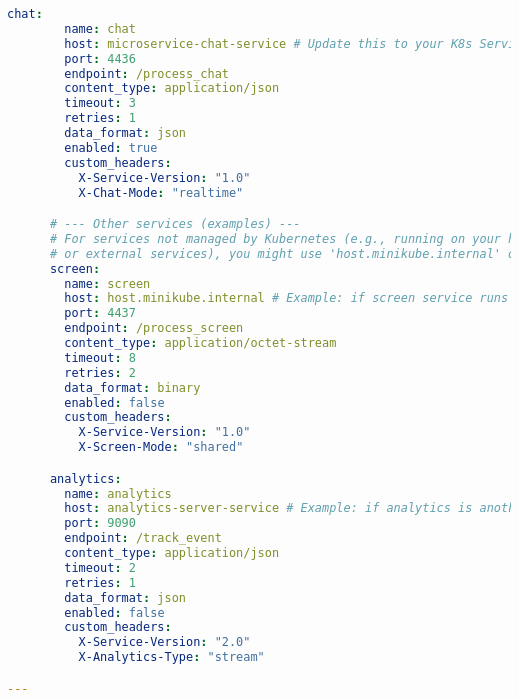\begin{lstlisting}[breaklines=true, caption={Router Kubernetes Deployment}, language=yaml]
      chat:
        name: chat
        host: microservice-chat-service # Update this to your K8s Service Name
        port: 4436
        endpoint: /process_chat
        content_type: application/json
        timeout: 3
        retries: 1
        data_format: json
        enabled: true
        custom_headers:
          X-Service-Version: "1.0"
          X-Chat-Mode: "realtime"

      # --- Other services (examples) ---
      # For services not managed by Kubernetes (e.g., running on your host machine
      # or external services), you might use 'host.minikube.internal' or their external IP.
      screen:
        name: screen
        host: host.minikube.internal # Example: if screen service runs on your host
        port: 4437
        endpoint: /process_screen
        content_type: application/octet-stream
        timeout: 8
        retries: 2
        data_format: binary
        enabled: false
        custom_headers:
          X-Service-Version: "1.0"
          X-Screen-Mode: "shared"

      analytics:
        name: analytics
        host: analytics-server-service # Example: if analytics is another K8s service
        port: 9090
        endpoint: /track_event
        content_type: application/json
        timeout: 2
        retries: 1
        data_format: json
        enabled: false
        custom_headers:
          X-Service-Version: "2.0"
          X-Analytics-Type: "stream"

---


\end{lstlisting}
